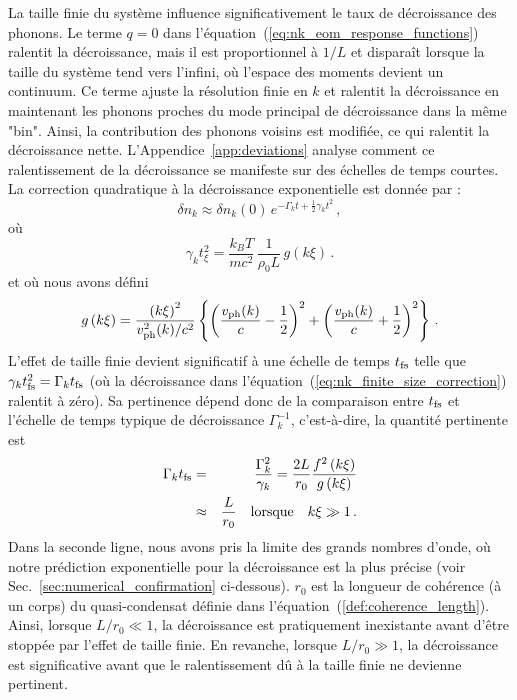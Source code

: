\documentclass[aps,prd,notitlepage,amsfonts,amssymb,amsmath,nofootinbib,superscriptaddress,longbibliography]{revtex4-2}
\newcommand{\resumefr}[1]{\textcolor{resumecolor}{#1}}
\begin{document}
\resumefr{
La taille finie du système influence significativement le taux de décroissance des phonons. Le terme $q=0$ dans l'équation~(\ref{eq:nk_eom_response_functions}) ralentit la décroissance, mais il est proportionnel à $1/L$ et disparaît lorsque la taille du système tend vers l'infini, où l'espace des moments devient un continuum. Ce terme ajuste la résolution finie en $k$ et ralentit la décroissance en maintenant les phonons proches du mode principal de décroissance dans la même "bin". Ainsi, la contribution des phonons voisins est modifiée, ce qui ralentit la décroissance nette.
L'Appendice~\ref{app:deviations} analyse comment ce ralentissement de la décroissance se manifeste sur des échelles de temps courtes. La correction quadratique à la décroissance exponentielle est donnée par :
\begin{equation*}
	\delta n_{k} \approx \delta n_{k}(0) \, e^{-\Gamma_{k}t + \frac{1}{2} \gamma_{k} t^{2}} \,,
	\label{eq:nk_finite_size_correction}
\end{equation*}
où
\begin{equation*}
	\label{def:prediction_small_gamma}
	\gamma_{k} t_{\xi}^2  = \frac{k_{B}T}{mc^{2}} \, \frac{1}{\rho_{0}L} \, g \left(k \xi\right)\,.
\end{equation*}
et où nous avons défini
\begin{equation*}
	g\left(k\xi\right) = \frac{\left(k\xi\right)^{2}}{v_{\rm ph}^{2}(k)/c^{2}}  \left\{ \left(\frac{v_{\rm ph}(k) }{c} - \frac{1}{2}\right)^{2} + \left(\frac{v_{\rm ph}(k) }{c} + \frac{1}{2}\right)^{2} \right\} \,.
\end{equation*}
L'effet de taille finie devient significatif à une échelle de temps $t_{\rm fs}$ telle que $\gamma_{k} t_{\rm fs}^{2} = \Gamma_{k} t_{\rm fs}$ (où la décroissance dans l'équation~(\ref{eq:nk_finite_size_correction}) ralentit à zéro). Sa pertinence dépend donc de la comparaison entre $t_{\rm fs}$ et l'échelle de temps typique de décroissance $\Gamma_k^{-1}$, c'est-à-dire, la quantité pertinente est
\begin{eqnarray*}
\label{eq:relevant_finite_size}
\Gamma_{k} t_{\rm fs} &=& \frac{\Gamma_{k}^{2}}{\gamma_{k}} = \frac{2 L}{r_{0}}  \frac{f^2\left(k\xi\right)}{g\left(k\xi\right)} \nonumber \\
&\approx& \frac{L}{r_{0}} \quad {\rm lorsque} \quad k\xi \gg 1 \,.
\end{eqnarray*}
Dans la seconde ligne, nous avons pris la limite des grands nombres d'onde, où notre prédiction exponentielle pour la décroissance est la plus précise (voir Sec.~\ref{sec:numerical_confirmation} ci-dessous). $r_0$ est la longueur de cohérence (à un corps) du quasi-condensat définie dans l'équation~(\ref{def:coherence_length}). Ainsi, lorsque $L/r_{0} \ll 1$, la décroissance est pratiquement inexistante avant d'être stoppée par l'effet de taille finie. En revanche, lorsque $L/r_{0} \gg 1$, la décroissance est significative avant que le ralentissement dû à la taille finie ne devienne pertinent.
}
\end{document}
